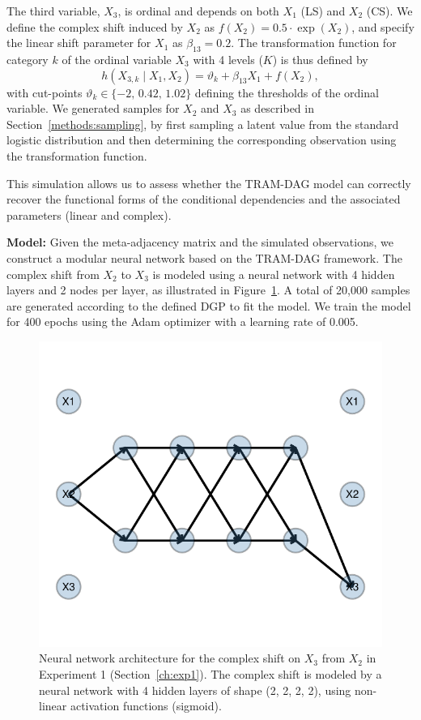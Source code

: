 The third variable, $X_3$, is ordinal and depends on both $X_1$ (LS) and $X_2$ (CS). We define the complex shift induced by $X_2$ as $f(X_2) = 0.5 \cdot \exp(X_2)$, and specify the linear shift parameter for $X_1$ as $\beta_{13} = 0.2$. The transformation function for category $k$ of the ordinal variable $X_3$ with 4 levels ($K$) is thus defined by 
\[
h(X_{3,k} \mid X_1, X_2) = \vartheta_k + \beta_{13} X_1 + f(X_2),
\]
with cut-points $\vartheta_k \in \{-2,\, 0.42,\, 1.02\}$ defining the thresholds of the ordinal variable. We generated samples for $X_2$ and $X_3$ as described in Section~\ref{methods:sampling}, by first sampling a latent value from the standard logistic distribution and then determining the corresponding observation using the transformation function.

This simulation allows us to assess whether the TRAM-DAG model can correctly recover the functional forms of the conditional dependencies and the associated parameters (linear and complex).

\medskip

\textbf{Model:} Given the meta-adjacency matrix and the simulated observations, we construct a modular neural network based on the TRAM-DAG framework. The complex shift from $X_2$ to $X_3$ is modeled using a neural network with 4 hidden layers and 2 nodes per layer, as illustrated in Figure~\ref{fig:exp1_CS}. A total of 20,000 samples are generated according to the defined DGP to fit the model. We train the model for 400 epochs using the Adam optimizer \citep{kingma2015} with a learning rate of 0.005.



\begin{figure}[H]
\centering
\includegraphics[width=0.5\linewidth]{img/exp1_CS.pdf}
\caption{Neural network architecture for the complex shift on $X_3$ from $X_2$ in Experiment 1 (Section~\ref{ch:exp1}). The complex shift is modeled by a neural network with 4 hidden layers of shape (2, 2, 2, 2), using non-linear activation functions (sigmoid).}
\label{fig:exp1_CS}
\end{figure}




